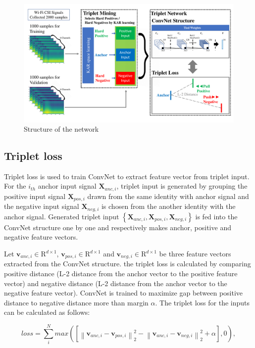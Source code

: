 \documentclass[runningheads]{llncs}
\begin{document}
\begin{figure}
    \includegraphics[width=\textwidth]{fig1_tcnn_kar_v2}
    \caption{Structure of the network} \label{fig1}
\end{figure}

\subsection{Triplet loss}

Triplet loss is used to train ConvNet to extract feature vector from triplet input.
For the $i_{th}$ anchor input signal $\mathbf{X}_{anc,i}$, triplet input is generated by grouping the positive input signal $\mathbf{X}_{pos,i}$ drawn from the same identity with anchor signal and the negative input signal $\mathbf{X}_{neg,i}$ is chosen from the another identity with the anchor signal.
Generated triplet input $\left\{\mathbf{X}_{anc,i},\mathbf{X}_{pos,i},\mathbf{X}_{neg,i}\right\}$ is fed into the ConvNet structure one by one and respectively makes anchor, positive and negative feature vectors.

Let $\mathbf{v}_{anc,i}\in{\mathrm{R}}^{d\times1}$, $\mathbf{v}_{pos,i}\in{\mathrm{R}}^{d\times1}$ and $\mathbf{v}_{neg,i}\in{\mathrm{R}}^{d\times1}$ be three feature vectors extracted from the ConvNet structure. 
the triplet loss is calculated by comparing positive distance (L-2 distance from the anchor vector to the positive feature vector) and negative distance (L-2 distance from the anchor vector to the negative feature vector).
ConvNet is trained to maximize gap between positive distance to negative distance more than margin $\alpha$.
The triplet loss for the inputs can be calculated as follows:

\begin{equation}
    loss = \sum_i^N max\left({ \left[ {\left\| {{\mathbf{v}_{anc,i}} - {\mathbf{v}_{pos,i}}} \right\|_2^2} - {\left\| {{\mathbf{v}_{anc,i}} - {\mathbf{v}_{neg,i}}} \right\|_2^2}  + \alpha \right]}, 0 \right),
\end{equation} 
\end{document}
